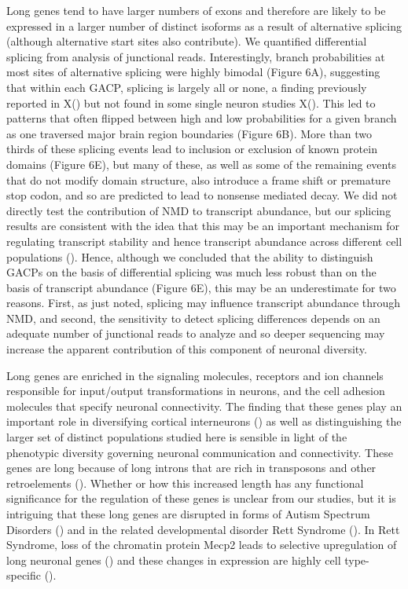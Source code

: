 Long genes tend to have larger numbers of exons and therefore are likely to be expressed in a larger number of distinct isoforms as a result of alternative splicing (although alternative start sites also contribute). We quantified differential splicing from analysis of junctional reads. Interestingly, branch probabilities at most sites of alternative splicing were highly bimodal (Figure 6A), suggesting that within each GACP, splicing is largely all or none, a finding previously reported in X() but not found in some single neuron studies X(). This led to patterns that often flipped between high and low probabilities for a given branch as one traversed major brain region boundaries (Figure 6B). More than two thirds of these splicing events lead to inclusion or exclusion of known protein domains (Figure 6E), but many of these, as well as some of the remaining events that do not modify domain structure, also introduce a frame shift or premature stop codon, and so are predicted to lead to nonsense mediated decay. We did not directly test the contribution of NMD to transcript abundance, but our splicing results are consistent with the idea that this may be an important mechanism for regulating transcript stability and hence transcript abundance across different cell populations (). Hence,  although we concluded that the ability to distinguish GACPs on the basis of differential splicing was much less robust than on the basis of transcript abundance (Figure 6E), this may be an underestimate for two reasons. First, as just noted, splicing may influence transcript abundance through NMD, and second, the sensitivity to detect splicing differences depends on an adequate number of junctional reads to analyze and so deeper sequencing may increase the apparent contribution of this component of neuronal diversity.     

Long genes are enriched in the signaling molecules, receptors and ion channels responsible for input/output transformations in neurons, and the cell adhesion molecules that specify neuronal connectivity. The finding that these genes play an important role in diversifying cortical interneurons () as well as distinguishing the larger set of distinct populations studied here is sensible in light of the phenotypic diversity governing neuronal communication and connectivity. These genes are long because of long introns that are rich in transposons and other retroelements (). Whether or how this increased length has any functional significance for the regulation of these genes is unclear from our studies, but it is intriguing that these long genes are disrupted in forms of Autism Spectrum Disorders () and in the related developmental disorder Rett Syndrome (). In Rett Syndrome, loss of the chromatin protein Mecp2 leads to selective upregulation of long neuronal genes () and these changes in expression are highly cell type-specific (). 

